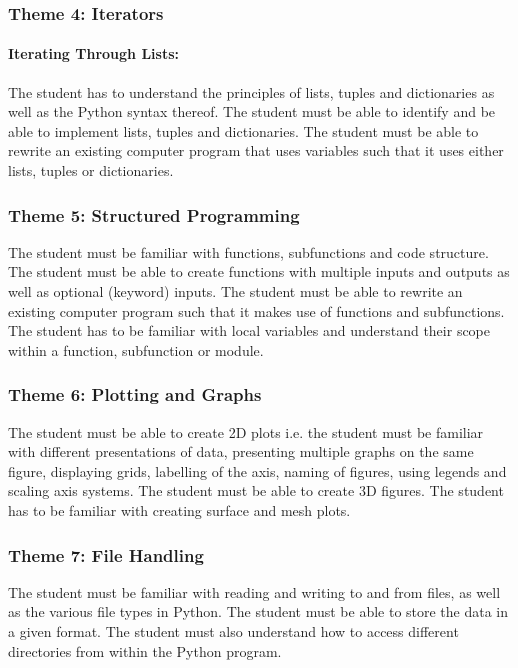         \subsubsection{Theme 4: Iterators}
            \paragraph{Iterating Through Lists:}
                The student has to understand the principles of lists, tuples and 
                dictionaries as well as the Python syntax thereof. The student must
                be able to identify and be able to implement lists, tuples and 
                dictionaries. The student must be able to rewrite an existing 
                computer program that uses variables such that it uses either
                lists, tuples or dictionaries.

        \subsubsection{Theme 5: Structured Programming}
            The student must be familiar with functions, subfunctions and code 
            structure. The student must be able to create functions with multiple 
            inputs and outputs as well as optional (keyword) inputs. The student 
            must be able to rewrite an existing computer program such that it makes
            use of functions and subfunctions. The student has to be familiar with 
            local variables and understand their scope within a function, 
            subfunction or module.

        \subsubsection{Theme 6: Plotting and Graphs}
            The student must be able to create 2D plots i.e. the student must be 
            familiar with different presentations of data, presenting multiple 
            graphs on the same figure, displaying grids, labelling of the axis, 
            naming of figures, using legends and scaling axis systems.
            The student must be able to create 3D figures. The student has to be 
            familiar with creating surface and mesh plots.

        \subsubsection{Theme 7: File Handling}
            The student must be familiar with reading and writing to and from 
            files, as well as the various file types in Python. The student must 
            be able to store the data in a given format. The student must also
            understand how to access different directories from within the Python
            program.

